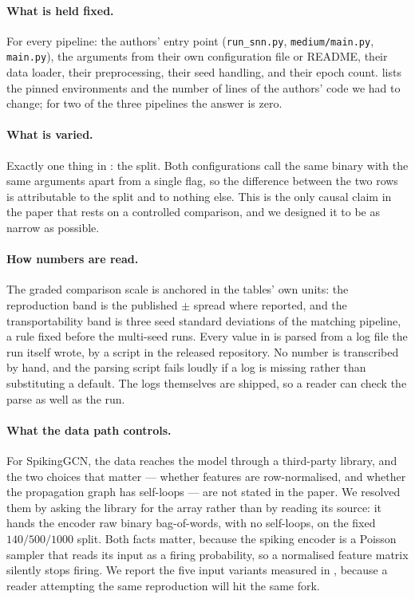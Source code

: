 \paragraph{What is held fixed.} For every pipeline: the authors' entry point (\texttt{run\_snn.py},
\texttt{medium/main.py}, \texttt{main.py}), the arguments from their own configuration file or README,
their data loader, their preprocessing, their seed handling, and their epoch count. 
lists the pinned environments and the number of lines of the authors' code we had to change; for two
of the three pipelines the answer is zero.

\paragraph{What is varied.} Exactly one thing in : the split. Both configurations
call the same binary with the same arguments apart from a single flag, so the difference between the
two rows is attributable to the split and to nothing else. This is the only causal claim in the paper
that rests on a controlled comparison, and we designed it to be as narrow as possible.

\paragraph{How numbers are read.} The graded comparison scale is anchored in the tables' own units:
the reproduction band is the published $\pm$ spread where reported, and the transportability band is
three seed standard deviations of the matching pipeline, a rule fixed before the multi-seed runs.
Every value in  is parsed from a log file the run
itself wrote, by a script in the released repository. No number is transcribed by hand, and the
parsing script fails loudly if a log is missing rather than substituting a default. The logs
themselves are shipped, so a reader can check the parse as well as the run.

\paragraph{What the data path controls.} For SpikingGCN, the data reaches
the model through a third-party library, and the two choices that matter --- whether features are
row-normalised, and whether the propagation graph has self-loops --- are not stated in the paper. We
resolved them by asking the library for the array rather than by reading its source: it hands the
encoder raw binary bag-of-words, with no self-loops, on the fixed $140/500/1000$ split. Both facts
matter, because the spiking encoder is a Poisson sampler that reads its input as a firing probability,
so a normalised feature matrix silently stops firing. We report the five input variants measured in
, because a reader attempting the same reproduction will hit the same fork.

